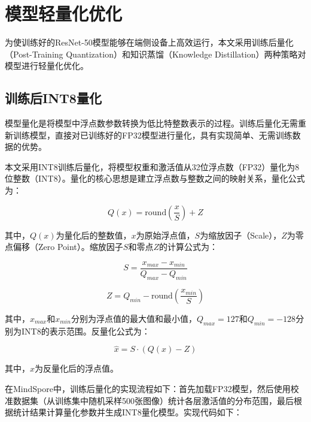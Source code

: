 \section{模型轻量化优化}

为使训练好的ResNet-50模型能够在端侧设备上高效运行，本文采用训练后量化（Post-Training Quantization）和知识蒸馏（Knowledge Distillation）两种策略对模型进行轻量化优化。

\subsection{训练后INT8量化}

模型量化是将模型中浮点数参数转换为低比特整数表示的过程\cite{jacob2018quantization}。训练后量化无需重新训练模型，直接对已训练好的FP32模型进行量化，具有实现简单、无需训练数据的优势。

本文采用INT8训练后量化，将模型权重和激活值从32位浮点数（FP32）量化为8位整数（INT8）。量化的核心思想是建立浮点数与整数之间的映射关系，量化公式为：

\begin{equation}
	Q(x) = \mathrm{round}\left(\frac{x}{S}\right) + Z
	\label{eq:quantize}
\end{equation}

其中，$Q(x)$为量化后的整数值，$x$为原始浮点值，$S$为缩放因子（Scale），$Z$为零点偏移（Zero Point）。缩放因子$S$和零点$Z$的计算公式为：

\begin{equation}
	S = \frac{x_{max} - x_{min}}{Q_{max} - Q_{min}}
	\label{eq:scale}
\end{equation}

\begin{equation}
	Z = Q_{min} - \mathrm{round}\left(\frac{x_{min}}{S}\right)
	\label{eq:zeropoint}
\end{equation}

其中，$x_{max}$和$x_{min}$分别为浮点值的最大值和最小值，$Q_{max}=127$和$Q_{min}=-128$分别为INT8的表示范围。反量化公式为：

\begin{equation}
	\hat{x} = S \cdot (Q(x) - Z)
	\label{eq:dequantize}
\end{equation}

其中，$\hat{x}$为反量化后的浮点值。

在MindSpore中，训练后量化的实现流程如下：首先加载FP32模型，然后使用校准数据集（从训练集中随机采样500张图像）统计各层激活值的分布范围，最后根据统计结果计算量化参数并生成INT8量化模型。实现代码如下：

